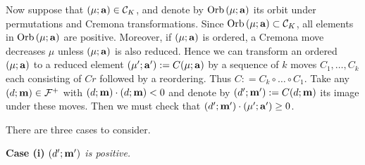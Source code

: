 \documentclass[11pt]{amsart}
\newcommand{\1}{{{\mathchoice {\rm 1\mskip-4mu l} {\rm 1\mskip-4mu l}
{\rm 1\mskip-4.5mu l} {\rm 1\mskip-5mu l}}}}
\newcommand{\ba} {{\bf a}}
\newcommand{\bm} {{\bf m}}
\newcommand{\bn} {{\bf n}}
\newcommand{\Orb}{{\rm Orb\,}}
\newcommand{\Cc}{{\mathcal C}}
\newcommand{\Ff}{{\mathcal F}}
\newcommand{\Ee}{{\mathcal E}}
\newcommand{\Z}{{\mathbb Z}}
\numberwithin{figure}{section}
\numberwithin{equation}{section}
\newcommand{\MS}{{\medskip}}
\newcommand{\NI}{{\noindent}}
\begin{document}
 
% 
 

Now suppose that $(\mu;\ba)\in \Cc_K$, and 
  denote by $\Orb(\mu;\ba)$  its orbit under 
 permutations and Cremona transformations.  
   Since   
  $\Orb(\mu;\ba)\subset \Cc_K$, all elements in $\Orb(\mu;\ba)$ are positive. 
  Moreover, if $(\mu;\ba)$ is ordered,  a Cremona move decreases $\mu$ unless 
  $(\mu;\ba)$ is also reduced.  Hence
  we can transform an ordered $(\mu;\ba)$  to a reduced element 
  $(\mu';\ba'): = C(\mu;\ba)$ by a
   sequence  of $k$ moves $C_1,\dots, C_k$
   each consisting of $Cr$  followed by a reordering.
   Thus $C: = C_k\circ \dots\circ C_1$.
   Take any $(d;\bm)\in \Ff^+$ with $(d;\bm)\cdot (d;\bm) < 0$ and 
   denote by $(d';\bm'):= C (d;\bm)$ its image 
   under these moves.  Then we must check that
   $(d';\bm')\cdot (\mu';\ba') \ge 0$.
   
   There are three cases to consider.
   \MS
   
   \NI {\bf Case (i)}   {\it $(d';\bm')$ is positive. }
   
\end{document}
